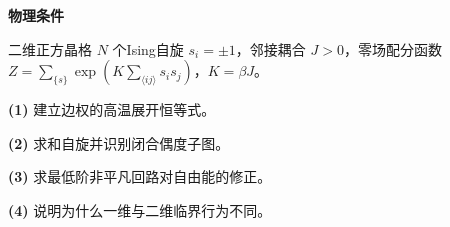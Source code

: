 \textbf{物理条件}\par 二维正方晶格 \(N\) 个Ising自旋 \(s_i=\pm1\)，邻接耦合 \(J>0\)，零场配分函数 \(Z=\sum_{\{s\}}\exp(K\sum_{\langle ij\rangle}s_is_j)\)，\(K=\beta J\)。
\par\noindent\textbf{(1)} 建立边权的高温展开恒等式。
\par\noindent\textbf{(2)} 求和自旋并识别闭合偶度子图。
\par\noindent\textbf{(3)} 求最低阶非平凡回路对自由能的修正。
\par\noindent\textbf{(4)} 说明为什么一维与二维临界行为不同。
